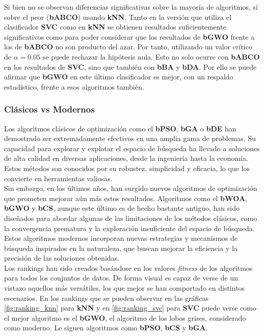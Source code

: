 Si bien no se observan diferencias significativas sobre la mayoría de algoritmos, sí sobre el peor (\textbf{bABCO}) usando \textbf{kNN}. Tanto en la versión que utiliza el clasificador \textbf{SVC} como en \textbf{kNN} se obtienen resultados suficientemente significativos como para poder considerar que los resultados de \textbf{bGWO} frente a los de \textbf{bABCO} no son producto del azar. Por tanto, utilizando un valor crítico de $\alpha=0.05$ se puede rechazar la hipótesis nula. Esto no solo ocurre con \textbf{bABCO} en los resultados de \textbf{SVC}, sino que también con \textbf{bBA} y \textbf{bDA}. Por ello se puede afirmar que \textbf{bGWO} en este último clasificador es mejor, con un respaldo estadístico, frente a esos algoritmos también.

\subsubsection{Clásicos vs Modernos}
Los algoritmos clásicos de optimización como el \textbf{bPSO}, \textbf{bGA} o \textbf{bDE} han demostrado ser extremadamente efectivos en una amplia gama de problemas. Su capacidad para explorar y explotar el espacio de búsqueda ha llevado a soluciones de alta calidad en diversas aplicaciones, desde la ingeniería hasta la economía. Estos métodos son conocidos por su robustez, simplicidad y eficacia, lo que los convierte en herramientas valiosas.\\[6pt]
Sin embargo, en los últimos años, han surgido nuevos algoritmos de optimización que prometen mejorar aún más estos resultados. Algoritmos como el \textbf{bWOA}, \textbf{bGWO} y \textbf{bCS}, aunque este último es de hecho bastante antiguo, han sido diseñados para abordar algunas de las limitaciones de los métodos clásicos, como la convergencia prematura y la exploración insuficiente del espacio de búsqueda. Estos algoritmos modernos incorporan nuevas estrategias y mecanismos de búsqueda inspirados en la naturaleza, que buscan mejorar la eficiencia y la precisión de las soluciones obtenidas.\\[6pt]

Los rankings han sido creados basándose en los valores \textit{fitness} de los algoritmos para todos los conjuntos de datos. De forma visual es capaz de verse de un vistazo aquellos más versátiles, los que mejor se han comportado en distintos escenarios. En los rankings que se pueden observar en las gráficas \ref{fig:ranking_knn} para \textbf{kNN} y en \ref{fig:ranking_svc} para \textbf{SVC} puede verse como el mejor algoritmo es el \textbf{bGWO}, el algoritmo de los lobos grises, considerado como moderno. Le siguen algoritmos como \textbf{bPSO}, \textbf{bCS} y \textbf{bGA}.\\[6pt]

